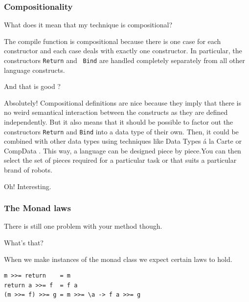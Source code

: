\subsubsection{Compositionality} 

\begin{dialogue} 
\speak{\studname{}} What does it mean that my technique is compositional?

\speak{\docname{}} The compile function is compositional because there
is one case for each constructor and each case deals with exactly one
constructor. In particular, the constructors {\tt Return} and {\tt
  Bind} are handled completely separately from all other language
constructs.

\speak{\studname{}} And that is good ? 

\speak{\docname{}} Absolutely! Compositional definitions are nice
because they imply that there is no weird semantical interaction
between the constructs as they are defined independently. But it also
means that it should be possible to factor out the constructors
\texttt{Return} and \texttt{Bind} into a data type of their own. Then,
it could be combined with other data types using techniques like Data
Types \'{a} la Carte \cite{Wouter} or CompData \cite{CompData}. This
way, a language can be designed piece by piece.You can then select the
set of pieces required for a particular task or that suits a
particular brand of robots.

\speak{\studname{}} Oh! Interesting.
\end{dialogue}


\subsubsection{The Monad laws} 

\begin{dialogue}
\speak{\docname{}} There is still one problem with your method though.

\speak{\studname{}} What's that?

\speak{\docname{}} When we make instances of the monad class we expect
certain laws to hold. 

\end{dialogue}

\begin{small}
\begin{verbatim}
m >>= return    = m
return a >>= f  = f a
(m >>= f) >>= g = m >>= \a -> f a >>= g
\end{verbatim}
\end{small}

